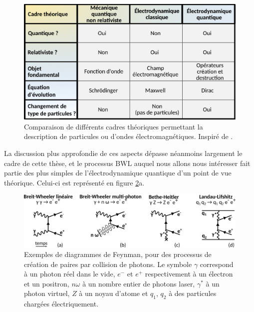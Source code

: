 \begin{refsection}
\begin{figure}[hbtp]
	\centering
	\includegraphics[width=\linewidth]{1-particules/tableau_comparaison_theories.png}
	\caption{Comparaison de différents cadres théoriques permettant la description de particules ou d'ondes électromagnétiques. Inspiré de \parencite{klauber_2015}.}
	\label{fig:21-tableau_comparaison_theories}
\end{figure}

La discussion plus approfondie de ces aspects dépasse néanmoins largement le cadre de cette thèse, et le processus BWL auquel nous allons nous intéresser fait partie des plus simples de l'électrodynamique quantique d'un point de vue théorique. Celui-ci est représenté en figure \ref{fig:1-diagrammes_electron-positron}a.

\begin{figure}[hbtp]
	\centering
	\includegraphics[width=\linewidth]{1-particules/QED_electron-positron.png}
	\caption{Exemples de diagrammes de Feynman, pour des processus de création de paires par collision de photons. Le symbole $\gamma$ correspond à un photon réel dans le vide, $e^-$ et $e^+$ respectivement à un électron et un positron, $n \omega$ à un nombre entier de photons laser, $\gamma^*$ à un photon virtuel, $Z$ à un noyau d'atome et $q_1$, $q_2$ à des particules chargées électriquement.}
	\label{fig:1-diagrammes_electron-positron}
\end{figure}


\end{refsection}
